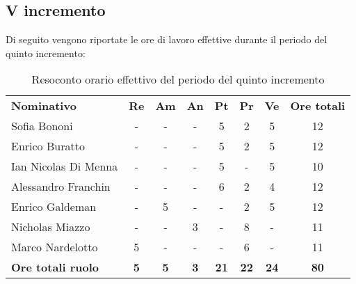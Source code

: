 \documentclass[../piano-di-progetto.tex]{subfiles}
\begin{document}
\subsection{V incremento}

Di seguito vengono riportate le ore di lavoro effettive durante il periodo del quinto incremento:
\begin{table}[H]
    \centering
    \begin{tabular}{lccccccc}
      \rowcolor{lightgray}
      \textbf{Nominativo}       & \textbf{Re}      & \textbf{Am} & \textbf{An}      & \textbf{Pt} & \textbf{Pr} & \textbf{Ve} & \textbf{Ore totali} \\
Sofia Bononi              & -          & -          & -          & 5           & 2           & 5           & 12          \\
Enrico Buratto            & -          & -          & -          & 5           & 2           & 5           & 12          \\
Ian Nicolas Di Menna      & -          & -          & -          & 5           & -           & 5           & 10          \\
Alessandro Franchin       & -          & -          & -          & 6           & 2           & 4           & 12          \\
Enrico Galdeman           & -          & 5          & -          & -           & 2           & 5           & 12          \\
Nicholas Miazzo           & -          & -          & 3          & -           & 8           & -           & 11          \\
Marco Nardelotto          & 5          & -          & -          & -           & 6           & -           & 11          \\
\textbf{Ore totali ruolo} & \textbf{5} & \textbf{5} & \textbf{3} & \textbf{21} & \textbf{22} & \textbf{24} & \textbf{80}
    \end{tabular}
    \caption{Resoconto orario effettivo del periodo del quinto incremento}
  \end{table}
\end{document}
